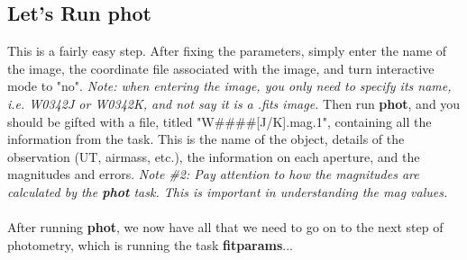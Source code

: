 \documentclass[a4paper]{article}
\begin{document}
\subsection{Let's Run \textbf{phot}}
This is a fairly easy step.  After fixing the parameters, simply enter the name of the image, the coordinate file associated with the image, and turn interactive mode to "no".  \textit{Note: when entering the image, you only need to specify its name, i.e. W0342J or W0342K, and not say it is a .fits image.}  Then run \textbf{phot}, and you should be gifted with a file, titled "W\#\#\#\#[J/K].mag.1", containing all the information from the task.  This is the name of the object, details of the observation (UT, airmass, etc.), the information on each aperture, and the magnitudes and errors.  \textit{Note \#2: Pay attention to how the magnitudes are calculated by the \textbf{phot} task.  This is important in understanding the mag values.}\\ \\
After running \textbf{phot}, we now have all that we need to go on to the next step of photometry, which is running the task \textbf{fitparams}...
\end{document}
